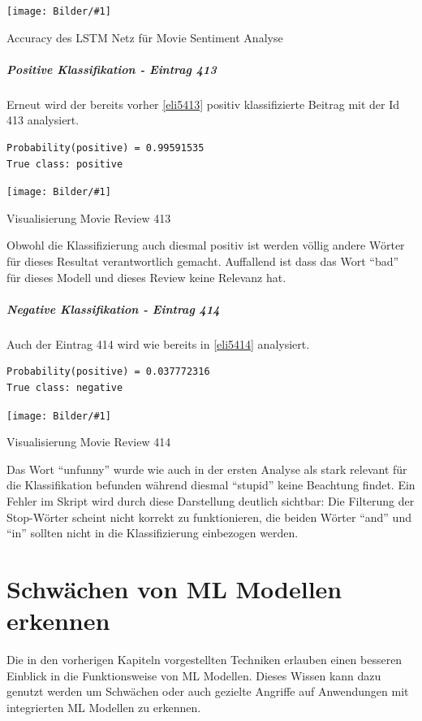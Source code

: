 \documentclass[
  12pt, %
  a4paper, %
  oneside, %
  openany, 
  numbers=noenddot, %
  BCOR=5mm, %
  parskip=half*, %
  thesis, %
]{bfhbook}
\newcommand{\imgText}[3]{
\begin{center}
    \begin{minipage}[t]{0.6\textwidth}
    		\vspace{0pt}
		\texttt{[image: Bilder/\#1]}
		\caption{#2}
	\end{minipage}\hfill
    \begin{minipage}[t]{0.4\textwidth}
    		\vspace{5pt}
  		#3
    \end{minipage}
\end{center}
}
\begin{document}
\imgText{MovieReview-LSTM-Accuracy.PNG}{Accuracy des LSTM Netz für Movie Sentiment Analyse}{

}

\paragraph*{Positive Klassifikation - Eintrag 413}
Erneut wird der bereits vorher \ref{eli5413} positiv klassifizierte Beitrag mit der Id 413 analysiert.
\begin{lstlisting}
Probability(positive) = 0.99591535
True class: positive
\end{lstlisting}
\imgText{MovieReview-LSTM-Display-413.PNG}{Visualisierung Movie Review 413}{
Obwohl die Klassifizierung auch diesmal positiv ist werden völlig andere Wörter für dieses Resultat verantwortlich gemacht.
Auffallend ist dass das Wort ``bad'' für dieses Modell und dieses Review keine Relevanz hat.
}

\paragraph*{Negative Klassifikation - Eintrag 414}
Auch der Eintrag 414 wird wie bereits in \ref{eli5414} analysiert.
\begin{lstlisting}
Probability(positive) = 0.037772316
True class: negative
\end{lstlisting}
\imgText{MovieReview-LSTM-Display-414.PNG}{Visualisierung Movie Review 414}{
Das Wort ``unfunny'' wurde wie auch in der ersten Analyse als stark relevant für die Klassifikation befunden während diesmal ``stupid'' keine Beachtung findet. Ein Fehler im Skript wird durch diese Darstellung deutlich sichtbar: Die Filterung der Stop-Wörter scheint nicht korrekt zu funktionieren, die beiden Wörter ``and'' und ``in'' sollten nicht in die Klassifizierung einbezogen werden.
}

\chapter{Schwächen von ML Modellen erkennen}
Die in den vorherigen Kapiteln vorgestellten Techniken erlauben einen besseren Einblick in die Funktionsweise von \Gls{ML} Modellen. Dieses Wissen kann dazu genutzt werden um Schwächen oder auch gezielte Angriffe auf Anwendungen mit integrierten \Gls{ML} Modellen zu erkennen.
\end{document}
